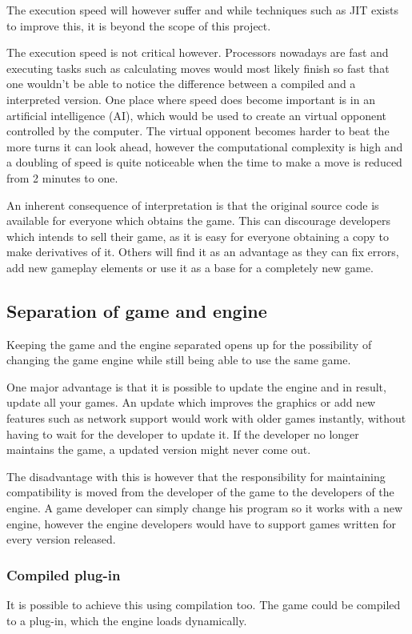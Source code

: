 The execution speed will however suffer and while techniques such as JIT exists
to improve this, it is beyond the scope of this project. 

The execution speed is not critical however. 
Processors nowadays are fast and executing tasks such as calculating moves would
most likely finish so fast that one wouldn't be able to notice the difference
between a compiled and a interpreted version.
One place where speed does become important is in an artificial intelligence
(AI), which would be used to create an virtual opponent controlled by the
computer. 
The virtual opponent becomes harder to beat the more turns it can look ahead,
however the computational complexity is high and a doubling of speed is quite
noticeable when the time to make a move is reduced from 2 minutes to one.

An inherent consequence of interpretation is that the original source code is
available for everyone which obtains the game. This can discourage developers
which intends to sell their game, as it is easy for everyone obtaining a copy to
make derivatives of it. Others will find it as an advantage as they can fix
errors, add new gameplay elements or use it as a base for a completely new game.

\subsection{Separation of game and engine}
\label{subsec:engineseperation}
Keeping the game and the engine separated opens up for the possibility of
changing the game engine while still being able to use the same game. 

One major advantage is that it is possible to update the engine and in result,
update all your games.  An update which improves the graphics or add new
features such as network support would work with older games instantly, without
having to wait for the developer to update it.  If the developer no longer
maintains the game, a updated version might never come out.

The disadvantage with this is however that the responsibility for maintaining
compatibility is moved from the developer of the game to the developers of the
engine. A game developer can simply change his program so it works with a new
engine, however the engine developers would have to support games written for
every version released.

\subsubsection{Compiled plug-in}
It is possible to achieve this using compilation too.  The game could be
compiled to a plug-in, which the engine loads dynamically.

